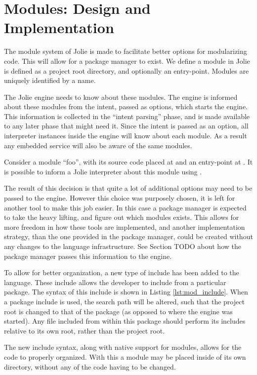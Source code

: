 \section{Modules: Design and Implementation}

The module system of Jolie is made to facilitate better options for
modularizing code. This will allow for a package manager to exist.  We define a
module in Jolie is defined as a project root directory, and optionally an
entry-point. Modules are uniquely identified by a name.

The Jolie engine needs to know about these modules. The engine is informed
about these modules from the intent, passed as options, which starts the
engine. This information is collected in the ``intent parsing'' phase, and is
made available to any later phase that might need it.  Since the intent is
passed as an option, all interpreter instances inside the engine will know
about each module.  As a result any embedded service will also be aware of the
same modules.

Consider a module ``foo'', with its source code placed at 
and an entry-point at . It is possible to inform a
Jolie interpreter about this module using
.

The result of this decision is that quite a lot of additional options may need
to be passed to the engine. However this choice was purposely chosen, it is
left for another tool to make this job easier. In this case a package manager
is expected to take the heavy lifting, and figure out which modules exists.
This allows for more freedom in how these tools are implemented, and another
implementation strategy, than the one provided in the package manager, could be
created without any changes to the language infrastructure. See Section TODO
about how the package manager passes this information to the engine.

To allow for better organization, a new type of include has been added to the
language. These include allows the developer to include from a particular
package. The syntax of this include is shown in Listing \ref{lst:mod_include}.
When a package include is used, the search path will be altered, such that the
project root is changed to that of the package (as opposed to where the engine
was started). Any file included from within this package should perform its
includes relative to its own root, rather than the project root.

The new include syntax, along with native support for modules, allows for the
code to properly organized. With this a module may be placed inside of its own
directory, without any of the code having to be changed.


